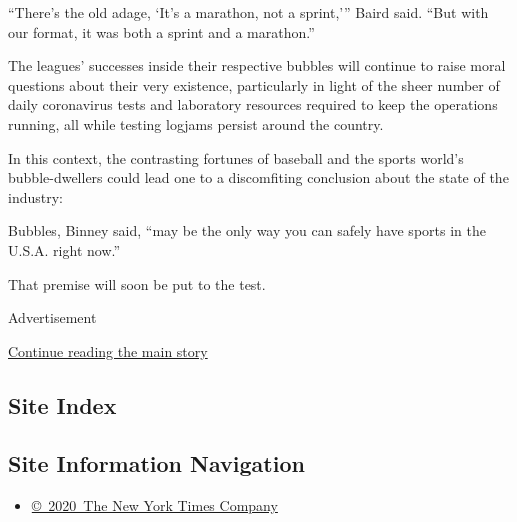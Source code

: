 ``There's the old adage, `It's a marathon, not a sprint,''' Baird said.
``But with our format, it was both a sprint and a marathon.''

The leagues' successes inside their respective bubbles will continue to
raise moral questions about their very existence, particularly in light
of the sheer number of daily coronavirus tests and laboratory resources
required to keep the operations running, all while testing logjams
persist around the country.

In this context, the contrasting fortunes of baseball and the sports
world's bubble-dwellers could lead one to a discomfiting conclusion
about the state of the industry:

Bubbles, Binney said, ``may be the only way you can safely have sports
in the U.S.A. right now.''

That premise will soon be put to the test.

Advertisement

\protect\hyperlink{after-bottom}{Continue reading the main story}

\hypertarget{site-index}{%
\subsection{Site Index}\label{site-index}}

\hypertarget{site-information-navigation}{%
\subsection{Site Information
Navigation}\label{site-information-navigation}}

\begin{itemize}
\tightlist
\item
  \href{https://help.nytimes.com/hc/en-us/articles/115014792127-Copyright-notice}{©~2020~The
  New York Times Company}
\end{itemize}

